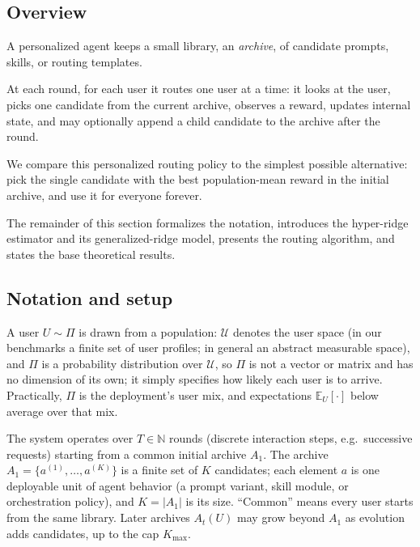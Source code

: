 \documentclass{article} %
\providecommand{\E}{\mathbb{E}}
\begin{document}
\subsection{Overview}

\label{sec:method-plain}

A personalized agent keeps a small library, an \emph{archive}, of candidate prompts, skills, or routing templates.

At each round, for each user it routes one user at a time: it looks at the user, picks one candidate from the current archive, observes a reward, updates internal state, and may optionally append a child candidate to the archive after the round.

We compare this personalized routing policy to the simplest possible alternative: pick the single candidate with the best population-mean reward in the initial archive, and use it for everyone forever.

The remainder of this section formalizes the notation, introduces the hyper-ridge estimator and its generalized-ridge model, presents the routing algorithm, and states the base theoretical results.

\subsection{Notation and setup}

\label{sec:method-notation}

A user $U \sim \Pi$ is drawn from a population: $\mathcal{U}$ denotes the user space (in our benchmarks a finite set of user profiles; in general an abstract measurable space), and $\Pi$ is a probability distribution over $\mathcal{U}$, so $\Pi$ is not a vector or matrix and has no dimension of its own; it simply specifies how likely each user is to arrive. Practically, $\Pi$ is the deployment's user mix, and expectations $\E_U[\cdot]$ below average over that mix.

The system operates over $T \in \mathbb{N}$ rounds (discrete interaction steps, e.g.\ successive requests) starting from a common initial archive $A_1$. The archive $A_1 = \{a^{(1)}, \dots, a^{(K)}\}$ is a finite set of $K$ candidates; each element $a$ is one deployable unit of agent behavior (a prompt variant, skill module, or orchestration policy), and $K = |A_1|$ is its size. ``Common'' means every user starts from the same library. Later archives $A_t(U)$ may grow beyond $A_1$ as evolution adds candidates, up to the cap $K_{\max}$.
\end{document}
